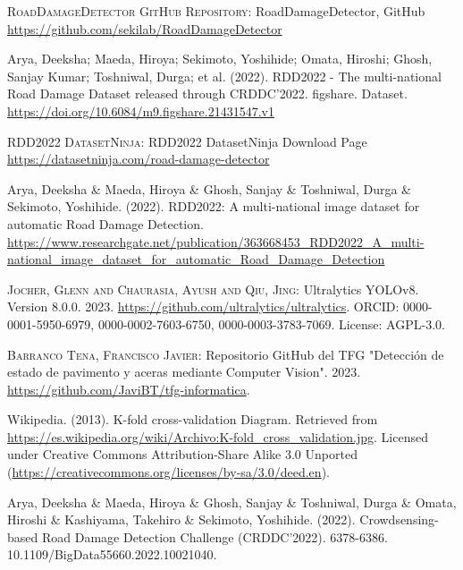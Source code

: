 
\begin{thebibliography}{10}

        \textsc{RoadDamageDetector GitHub Repository}:
        RoadDamageDetector, GitHub
        \url{https://github.com/sekilab/RoadDamageDetector}

    Arya, Deeksha; Maeda, Hiroya; Sekimoto, Yoshihide; Omata, Hiroshi; Ghosh, Sanjay Kumar; Toshniwal, Durga; et al. (2022). RDD2022 - The multi-national Road Damage Dataset released through CRDDC'2022. figshare. Dataset. \url{https://doi.org/10.6084/m9.figshare.21431547.v1}

        \textsc{RDD2022 DatasetNinja}:
        RDD2022 DatasetNinja Download Page
        \url{https://datasetninja.com/road-damage-detector}

        Arya, Deeksha \& Maeda, Hiroya \& Ghosh, Sanjay \& Toshniwal, Durga \& Sekimoto, Yoshihide. (2022). RDD2022: A multi-national image dataset for automatic Road Damage Detection. 
        \url{https://www.researchgate.net/publication/363668453_RDD2022_A_multi-national_image_dataset_for_automatic_Road_Damage_Detection}

        \textsc{Jocher, Glenn and Chaurasia, Ayush and Qiu, Jing}:
        Ultralytics YOLOv8.
        Version 8.0.0.
        2023.
        \url{https://github.com/ultralytics/ultralytics}.
        \textsc{ORCID}: 0000-0001-5950-6979, 0000-0002-7603-6750, 0000-0003-3783-7069.
        License: AGPL-3.0.

        \textsc{Barranco Tena, Francisco Javier}:
        Repositorio GitHub del TFG "Detección de estado de pavimento y aceras mediante Computer Vision".
        2023.
        \url{https://github.com/JaviBT/tfg-informatica}.

        Wikipedia. (2013). K-fold cross-validation Diagram.
        Retrieved from  \url{https://es.wikipedia.org/wiki/Archivo:K-fold_cross_validation.jpg}.
        Licensed under Creative Commons Attribution-Share Alike 3.0 Unported (\url{https://creativecommons.org/licenses/by-sa/3.0/deed.en}).


        Arya, Deeksha \& Maeda, Hiroya \& Ghosh, Sanjay \& Toshniwal, Durga \& Omata, Hiroshi \& Kashiyama, Takehiro \& Sekimoto, Yoshihide. (2022). Crowdsensing-based Road Damage Detection Challenge (CRDDC’2022). 6378-6386. 10.1109/BigData55660.2022.10021040.


\end{thebibliography}

